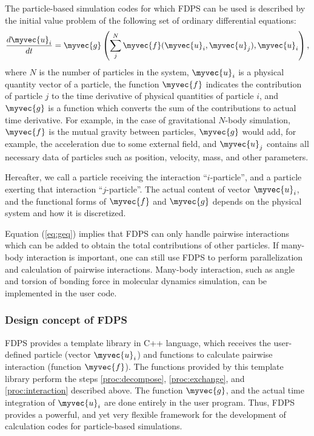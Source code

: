 The particle-based simulation codes for which FDPS can be used is
described by the initial value problem of the following set of 
ordinary differential equations:
\begin{align}
  \frac{d\myvec{u}_i}{dt} = \myvec{g}\left(\sum_j^N \myvec{f}
  (\myvec{u}_i, \myvec{u}_j), \myvec{u}_i\right), \label{eq:geq}
\end{align}
where $N$ is the number of particles in the system, $\myvec{u}_i$ is a
physical quantity vector of a particle, the function $\myvec{f}$
indicates the contribution of particle $j$ to the time derivative of
physical quantities of particle $i$, and $\myvec{g}$ is a function
which converts the sum of the contributions to actual time
derivative. For example, in the case of gravitational $N$-body
simulation, $\myvec{f}$ is the mutual gravity between particles,
$\myvec{g}$ would add, for example, the acceleration due to some
external field, and $\myvec{u}_j$ contains all necessary data of
particles such as position, velocity, mass, and other parameters.

Hereafter, we call a particle receiving the interaction
``$i$-particle'', and a particle exerting that interaction
``$j$-particle''. The actual content of vector $\myvec{u}_i$, and the
functional forms of $\myvec{f}$ and $\myvec{g}$ depends on the
physical system and how it is discretized.

Equation (\ref{eq:geq}) implies that FDPS can only handle pairwise
interactions which can be added to obtain the total contributions of
other particles. If many-body interaction is important, one can still
use FDPS to perform parallelization and calculation of pairwise
interactions. Many-body interaction, such as angle and torsion of
bonding force in molecular dynamics simulation, can be implemented in
the user code.

\subsubsection{Design concept of FDPS}
\label{sec:concept}

FDPS provides a template library in C++ language, which receives the
user-defined particle (vector $\myvec{u}_i$) and functions to
calculate pairwise interaction (function $\myvec{f}$). The functions
provided by this template library perform the steps
\ref{proc:decompose}, \ref{proc:exchange}, and \ref{proc:interaction}
described above. The function $\myvec{g}$, and the actual time
integration of $\myvec{u}_i$ are done entirely in the user
program. Thus, FDPS provides a powerful, and yet very flexible
framework for the development of calculation codes for particle-based
simulations.

